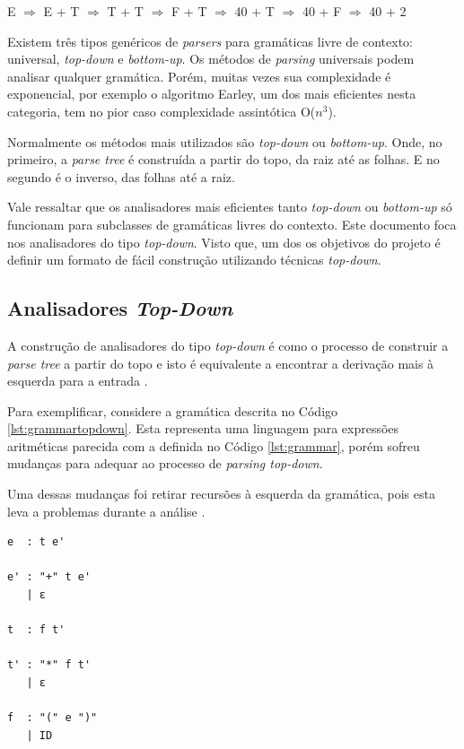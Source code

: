 \begin{center}
    E $\Rightarrow$ E + T $\Rightarrow$ T + T $\Rightarrow$ F + T $\Rightarrow$ 40 + T $\Rightarrow$ 40 + F $\Rightarrow$ 40 + 2
\end{center}

Existem três tipos genéricos de \textit{parsers} para gramáticas livre de contexto: 
universal, \textit{top-down} e \textit{bottom-up}. Os métodos de \textit{parsing}
universais podem analisar qualquer gramática. Porém, muitas vezes sua complexidade é exponencial, por exemplo o algoritmo Earley,
um dos mais eficientes nesta categoria, tem no pior caso complexidade assintótica O($n^3$).

Normalmente os métodos mais utilizados são  \textit{top-down} ou \textit{bottom-up}. Onde, no primeiro,
a \textit{parse tree} é construída a partir do topo, da raiz até as folhas. E no segundo é o inverso,
das folhas até a raiz. 

Vale ressaltar que os analisadores mais eficientes tanto \textit{top-down} ou \textit{bottom-up}  
só funcionam para subclasses de gramáticas livres do contexto. Este documento foca nos analisadores
do tipo \textit{top-down}. Visto que, um dos os objetivos do projeto é definir um formato de fácil construção
utilizando técnicas \textit{top-down}.

\subsection{Analisadores \textit{Top-Down}}

A construção de analisadores do tipo \textit{top-down} é como o processo de
construir a \textit{parse tree} a partir do topo e isto é
equivalente a encontrar a derivação mais à esquerda para a entrada \cite{aho2006}.

Para exemplificar, considere a gramática descrita no Código \ref{lst:grammartopdown}. Esta
representa uma linguagem para expressões aritméticas parecida com a definida no 
Código \ref{lst:grammar}, porém sofreu mudanças para adequar ao processo de \textit{parsing top-down}.

Uma dessas mudanças foi retirar recursões à esquerda da gramática, pois esta leva a
problemas durante a análise \cite{aho2006}.

\begin{lstlisting}[caption=Exemplo de gramática para analisadores top-down onde o símbolo epsilon representa uma produção vazia.,label={lst:grammartopdown}]
e  : t e'

e' : "+" t e' 
   | ε

t  : f t'

t' : "*" f t' 
   | ε

f  : "(" e ")"
   | ID
\end{lstlisting}

